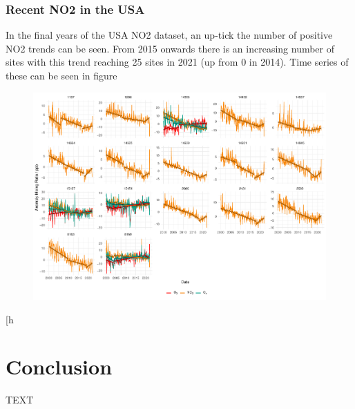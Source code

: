 \documentclass[journal abbreviation, manuscript]{copernicus}
\begin{document}
\subsubsection{Recent NO2 in the USA} 
In the final years of the USA NO2 dataset, an up-tick the number of positive NO2 trends can be seen. From 2015 onwards there is an increasing number of sites with this trend reaching 25 sites in 2021 (up from 0 in 2014). Time series of these can be seen in figure



\begin{figure}
    \includegraphics[width=12cm]{figures/f14_no2_in_usa.pdf}
\caption{}
\label{fig:no2_in_usa}
\end{figure}[h

\section{Conclusion}  %
TEXT






\end{document}
